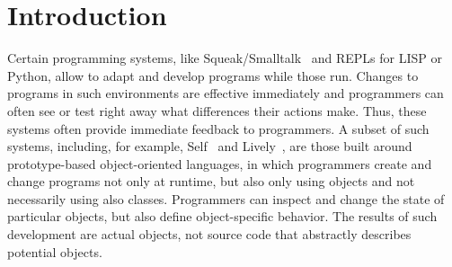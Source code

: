 
\chapter{Introduction} \label{chapter:INTRODUCTION}

Certain programming systems, like Squeak/Smalltalk~\cite{GoldbergRobson83} and REPLs for LISP or Python, allow to adapt and develop programs while those run.
Changes to programs in such environments are effective immediately and programmers can often see or test right away what differences their actions make.
Thus, these systems often provide immediate feedback to programmers.
A subset of such systems, including, for example, Self~\cite{Ungar1987SPS,Ungar2007SEL} and Lively~\cite{Ingalls2008LKS,Krahn2009LWD}, are those built around prototype-based object-oriented languages, in which programmers create and change programs not only at runtime, but also only using objects and not necessarily using also classes.
Programmers can inspect and change the state of particular objects, but also define object-specific behavior.
The results of such development are actual objects, not source code that abstractly describes potential objects.

